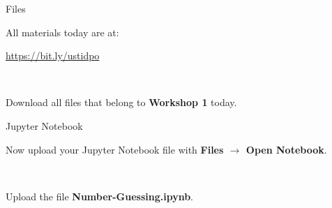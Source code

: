 \documentclass[dvipsnames, svgnames, x11names]{beamer}
\begin{document}
\begin{frame}[fragile]{Files}
    \begin{center}
        All materials today are at:

        \href{https://bit.ly/ustidpo}{https://bit.ly/ustidpo}

        \


        Download all files that belong to \textbf{Workshop 1} today.
    \end{center}
\end{frame}

\begin{frame}[fragile]{Jupyter Notebook}
    \begin{center}
        Now upload your Jupyter Notebook file with \textbf{Files $\rightarrow$ Open Notebook}.
    
        \


        Upload the file \textbf{Number-Guessing.ipynb}.
    
    \end{center}
\end{frame}
\end{document}
